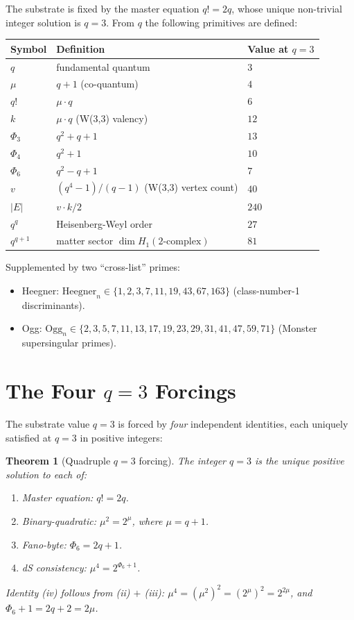 \documentclass[11pt]{article}
\newtheorem{theorem}{Theorem}
\begin{document}
The substrate is fixed by the master equation $q! = 2q$, whose unique
non-trivial integer solution is $q = 3$.  From $q$ the following
primitives are defined:
\begin{center}\begin{tabular}{lll}
\toprule
\textbf{Symbol} & \textbf{Definition} & \textbf{Value at $q=3$} \\
\midrule
$q$        & fundamental quantum         & $3$ \\
$\mu$      & $q + 1$ (co-quantum)         & $4$ \\
$q!$       & $\mu \cdot q$                & $6$ \\
$k$        & $\mu \cdot q$ (W(3,3) valency) & $12$ \\
$\Phi_3$   & $q^2 + q + 1$               & $13$ \\
$\Phi_4$   & $q^2 + 1$                    & $10$ \\
$\Phi_6$   & $q^2 - q + 1$                & $7$ \\
$v$        & $(q^4-1)/(q-1)$ (W(3,3) vertex count) & $40$ \\
$|E|$      & $v \cdot k / 2$              & $240$ \\
$q^q$      & Heisenberg-Weyl order        & $27$ \\
$q^{q+1}$  & matter sector $\dim H_1(2\text{-complex})$ & $81$ \\
\bottomrule
\end{tabular}\end{center}

Supplemented by two ``cross-list'' primes:
\begin{itemize}[noitemsep]
  \item Heegner: $\mathrm{Heegner}_n \in \{1, 2, 3, 7, 11, 19, 43, 67, 163\}$
    (class-number-1 discriminants).
  \item Ogg: $\mathrm{Ogg}_n \in \{2, 3, 5, 7, 11, 13, 17, 19, 23, 29, 31,
    41, 47, 59, 71\}$ (Monster supersingular primes).
\end{itemize}

\section{The Four $q = 3$ Forcings}

The substrate value $q = 3$ is forced by \emph{four} independent
identities, each uniquely satisfied at $q = 3$ in positive integers:

\begin{theorem}[Quadruple $q = 3$ forcing]\label{thm:fourfold}
The integer $q = 3$ is the unique positive solution to each of:
\begin{enumerate}[label=(\roman*),noitemsep]
  \item Master equation: $q! = 2q$.
  \item Binary-quadratic: $\mu^2 = 2^\mu$, where $\mu = q + 1$.
  \item Fano-byte: $\Phi_6 = 2q + 1$.
  \item dS consistency: $\mu^4 = 2^{\Phi_6 + 1}$.
\end{enumerate}
Identity (iv) follows from (ii) $+$ (iii):
$\mu^4 = (\mu^2)^2 = (2^\mu)^2 = 2^{2\mu}$, and $\Phi_6 + 1 = 2q+2 = 2\mu$.
\end{theorem}
\end{document}
